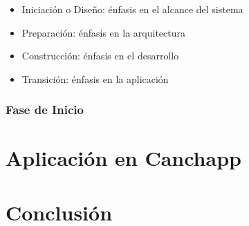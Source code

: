 \documentclass[spanish]{udpreport}
\begin{document}
\begin{itemize}
\item Iniciación o Diseño: énfasis en el alcance del sistema
\item Preparación: énfasis en la arquitectura
\item Construcción: énfasis en el desarrollo
\item Transición: énfasis en la aplicación

\end{itemize}

\subsection{Fase de Inicio}


\chapter{Aplicación en Canchapp}

\chapter{Conclusión}


\end{document}

